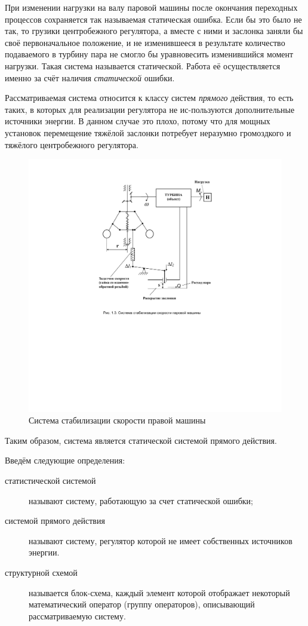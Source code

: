 При изменении нагрузки на валу паровой машины после окончания переходных процессов сохраняется так называемая статическая ошибка. Если бы это было не так, то грузики центробежного регулятора, а вместе с ними и заслонка заняли бы своё первоначальное положение, и не изменившееся в результате количество подаваемого в турбину пара не смогло бы уравновесить изменившийся момент нагрузки. Такая система называется статической. Работа её осуществляется именно за счёт наличия \textit{статической} ошибки. 

Рассматриваемая система относится к классу систем \textit{прямого} действия, то есть таких, в которых для реализации регулятора не ис-пользуются дополнительные источники энергии. В данном случае это плохо, потому что для мощных установок перемещение тяжёлой заслонки потребует неразумно громоздкого и тяжёлого центробежного регулятора.

\begin{figure}[h!]
	\centering
	\includegraphics[scale=0.95]{images/SteamMashine}
	\caption{Система стабилизации скорости правой машины }
	\label{fig:steammashine}
\end{figure}

Таким образом, система является статической системой прямого действия.

Введём следующие определения:
\begin{description}
	\item[статистической системой] называют систему, работающую за счет статической ошибки;
	\item[системой прямого действия] называют систему, регулятор которой не имеет собственных источников энергии.
	\item[структурной схемой] называется блок-схема, каждый элемент которой отображает некоторый математический оператор (группу операторов), описывающий рассматриваемую систему.
\end{description}

